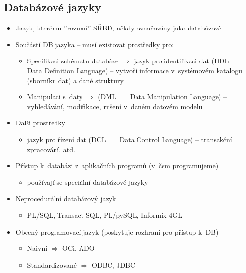 \documentclass[a4paper,10pt]{article}
\newcommand{\tedy}{$\Rightarrow$ }
\begin{document}
      \subsection{Databázové jazyky}
        \begin{itemize}
          \item Jazyk, kterému ''rozumí'' SŘBD, někdy označovány jako databázové
          \item Součástí DB jazyka -- musí existovat prostředky pro:
          \begin{itemize}
            \item Specifikaci schématu databáze \tedy jazyk pro identifikaci dat (DDL $=$ Data Definition Language) -- vytvoří informace v~systémovém katalogu (sborníku dat) a dané struktury
            \item Manipulaci s~daty \tedy (DML $=$ Data Manipulation Language) -- vyhledávání, modifikace, rušení v~daném datovém modelu
          \end{itemize}

          \item Další prostředky
          \begin{itemize}
            \item jazyk pro řízení dat (DCL $=$ Data Control Language) -- transakční zpracování, atd.
          \end{itemize}

          \item Přístup k~databázi z~aplikačních programů (v~čem programujeme)
          \begin{itemize}
            \item používají se speciální databázové jazyky
          \end{itemize}

          \item Neprocedurální databázový jazyk
          \begin{itemize}
            \item PL/SQL, Transact SQL, PL/pySQL, Informix 4GL
          \end{itemize}
          \item Obecný programovací jazyk (poskytuje rozhraní pro přístup k~DB)
          \begin{itemize}
            \item Naivní \tedy OCi, ADO
            \item Standardizované \tedy ODBC, JDBC
          \end{itemize}


\end{itemize}
\end{document}
